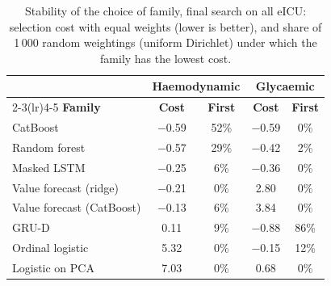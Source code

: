\begin{table}[htbp]
\centering\footnotesize
\caption{Stability of the choice of family, final search on all eICU: selection cost with equal weights (lower is better), and share of 1\,000 random weightings (uniform Dirichlet) under which the family has the lowest cost.}\label{tab:weights}
\begin{tabular}{@{}lcccc@{}}
\toprule
 & \multicolumn{2}{c}{\textbf{Haemodynamic}} & \multicolumn{2}{c}{\textbf{Glycaemic}} \\
\cmidrule(lr){2-3}\cmidrule(lr){4-5}
\textbf{Family} & \textbf{Cost} & \textbf{First} & \textbf{Cost} & \textbf{First} \\
\midrule
CatBoost & $-$0.59 & 52\% & $-$0.59 & 0\% \\
Random forest & $-$0.57 & 29\% & $-$0.42 & 2\% \\
Masked LSTM & $-$0.25 & 6\% & $-$0.36 & 0\% \\
Value forecast (ridge) & $-$0.21 & 0\% & 2.80 & 0\% \\
Value forecast (CatBoost) & $-$0.13 & 6\% & 3.84 & 0\% \\
GRU-D & 0.11 & 9\% & $-$0.88 & 86\% \\
Ordinal logistic & 5.32 & 0\% & $-$0.15 & 12\% \\
Logistic on PCA & 7.03 & 0\% & 0.68 & 0\% \\
\bottomrule
\end{tabular}
\end{table}
